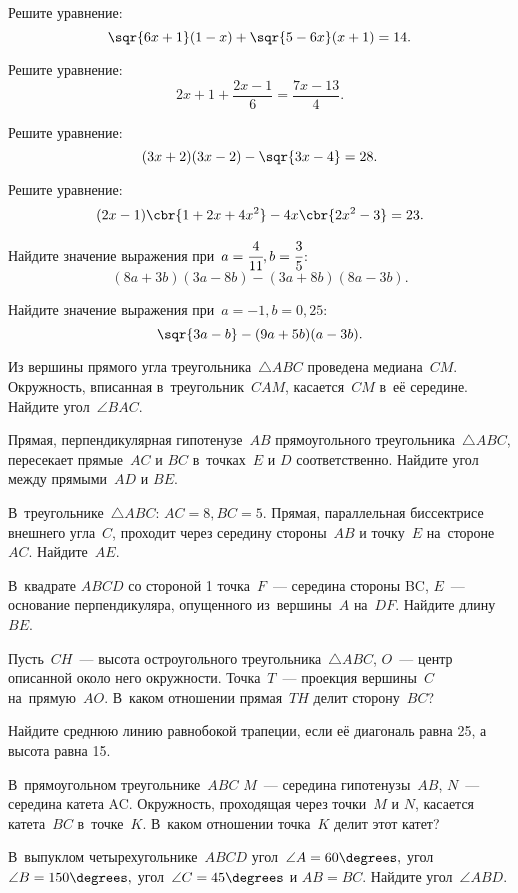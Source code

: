 %
Решите уравнение:
$$\sqr{6x+1}(1-x) + \sqr{5-6x}(x+1) = 14.$$

%
Решите уравнение:
$$2x + 1 + \frac{2x-1}6 = \frac{7x-13}4.$$

%
Решите уравнение:
$$(3x+2)(3x-2) - \sqr{3x-4} = 28.$$

%
Решите уравнение:
$$(2x-1)\cbr{1+2x+4x^2} - 4x\cbr{2x^2-3} = 23.$$

%
Найдите значение выражения при~$a=\cfrac{4}{11}, b=\cfrac{3}{5}$:
$$(8a+3b)(3a-8b) - (3a + 8b)(8a - 3b).$$

%
Найдите значение выражения при~$a = -1, b = 0{,}25$:
$$\sqr{3a-b} - (9a+5b)(a-3b).$$

%
Из вершины прямого угла треугольника~$\triangle ABC$ проведена медиана~$CM$. Окружность, вписанная в~треугольник~$CAM$, касается~$CM$ в~её середине. Найдите угол~$\angle BAC$.

%
Прямая, перпендикулярная гипотенузе~$AB$ прямоугольного треугольника~$\triangle ABC$, пересекает прямые~$AC$ и $BC$ в~точках~$E$ и $D$ соответственно. Найдите угол между прямыми~$AD$ и $BE$.

%
В~треугольнике~$\triangle ABC$: $AC = 8, BC = 5$. Прямая, параллельная биссектрисе внешнего угла~$C$, проходит через середину стороны~$AB$ и точку~$E$ на~стороне~$AC$. Найдите~$AE$.

%
В~квадрате $ABCD$ со стороной 1 точка~$F$~— середина стороны BC, $E$~— основание перпендикуляра, опущенного из~вершины~$A$ на~$DF$. Найдите длину~$BE$.

%
Пусть~$CH$~— высота остроугольного треугольника~$\triangle ABC$, $O$~— центр описанной около него окружности. Точка~$T$~— проекция вершины~$C$ на~прямую~$AO$. В~каком отношении прямая~$TH$ делит сторону~$BC$?

%
Найдите среднюю линию равнобокой трапеции, если её диагональ равна 25, а высота равна 15.

%
В~прямоугольном треугольнике~$ABC$ $M$~— середина гипотенузы~$AB$, $N$~— середина катета AC. Окружность, проходящая через точки~$M$ и $N$, касается катета~$BC$ в~точке~$K$. В~каком отношении точка~$K$ делит этот катет?

%
В~выпуклом четырехугольнике~$ABCD$ угол~$\angle A = 60\degrees,$ угол~$\angle B = 150\degrees,$ угол~$\angle C = 45\degrees$ и $AB = BC$. Найдите угол~$\angle ABD$.

